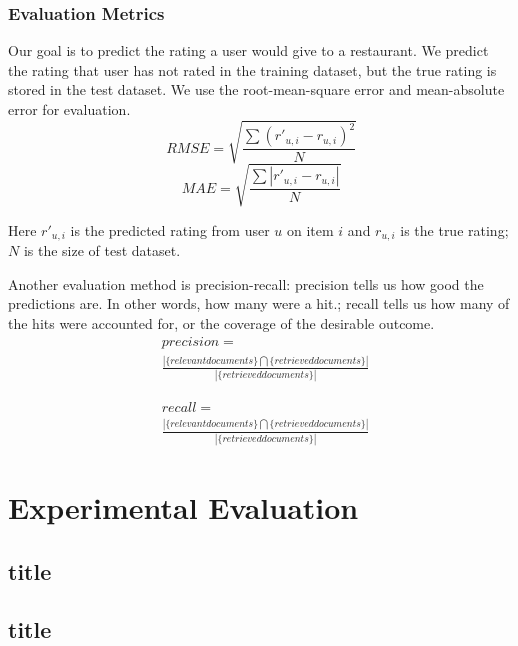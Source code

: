 \documentclass[conference]{IEEEtran}
\begin{document}
\subsubsection{Evaluation Metrics}
Our goal is to predict the rating a user would give to a restaurant. We predict the rating that user has not rated in the training dataset, but the true rating is stored in the test dataset. We use the root-mean-square error and mean-absolute error for evaluation.
\begin{equation}
\ RMSE = \sqrt{\frac{\sum{\left(r'_{u,i} - r_{u,i}\right)}^2}{N}}
\end{equation}
\begin{equation}
\ MAE = \sqrt{\frac{\sum{\left|r'_{u,i} - r_{u,i}\right|}}{N}}
\end{equation}

Here $r'_{u,i}$ is the predicted rating from user $u$ on item $i$ and $r_{u,i}$ is the true rating; $N$ is the size of test dataset. 

Another evaluation method is precision-recall: precision tells us how good the predictions are. In other words, how many were a hit.; recall tells us how many of the hits were accounted for, or the coverage of the desirable outcome.
\begin{equation}
\begin{split}
& precision = \\
& \frac{\left|\{relevant documents\}\bigcap \{retrieved documents\}\right|}{\left|\{retrieved documents\}\right|}
\end{split}
\end{equation}

\begin{equation}
\begin{split}
& recall = \\
&\frac{\left|\{relevant documents\}\bigcap \{retrieved documents\}\right|}{\left|\{retrieved documents\}\right|}
\end{split}
\end{equation}


\section{Experimental Evaluation }
\subsection{title}
\subsection{title}
\end{document}
